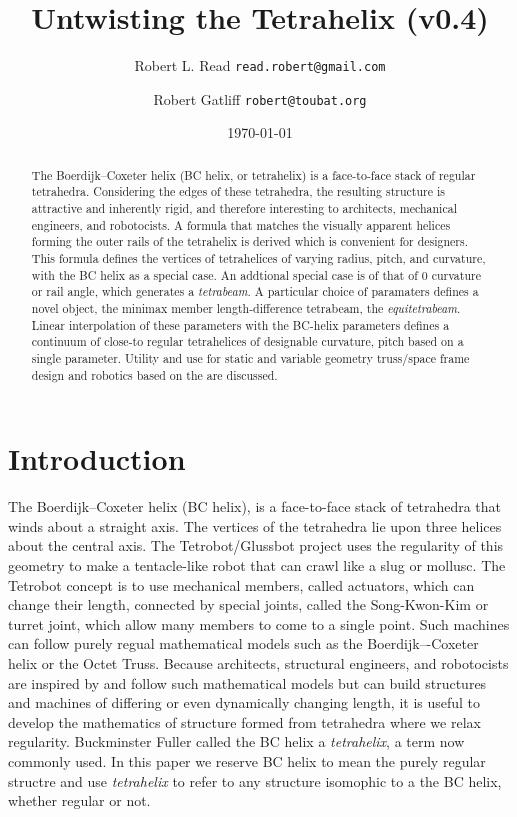 \documentclass[11pt]{article}
\title{Untwisting the Tetrahelix (v0.4)}
\author{Robert L. Read \texttt{read.robert@gmail.com} \and
  Robert Gatliff \texttt{robert@toubat.org}
}
\date{\today}
\begin{document}
\maketitle


\begin{abstract}
  The Boerdijk--Coxeter helix (BC helix, or tetrahelix) is a face-to-face stack of regular tetrahedra.
  Considering the edges of these tetrahedra, the resulting structure is attractive and inherently rigid,
  and therefore interesting to architects, mechanical engineers,
  and robotocists.
  A formula that matches the visually apparent helices forming the outer rails of the tetrahelix is derived which
  is convenient for designers.
  This formula defines the vertices of tetrahelices of varying radius, pitch, and curvature, with the BC helix
  as a special case. 
  An addtional special case is of that of $0$ curvature or rail angle, which generates a \emph{tetrabeam}.
  A particular choice of paramaters defines a novel object, the  minimax member length-difference tetrabeam,
  the \emph{equitetrabeam}.
  Linear interpolation of these parameters with the BC-helix parameters defines a continuum of close-to regular
  tetrahelices of designable curvature, pitch based on a single parameter.
  Utility and use for static and variable geometry truss/space frame design and robotics based on the are discussed.
\end{abstract}


\section{Introduction}

The Boerdijk--Coxeter helix\cite{coxeter1985simplicial} (BC helix),
is a face-to-face stack of tetrahedra that winds about a straight axis.
The vertices of the tetrahedra
lie upon three
helices about the central axis.
The Tetrobot/Glussbot\cite{TetrobotBook} project
uses the regularity of this geometry to make a tentacle-like robot that can crawl like a slug or mollusc.
The Tetrobot concept
is to use mechanical members, called actuators, which can change their length, connected by special joints, called the Song-Kwon-Kim\cite{song2003spherical} or turret joint,
which allow many
members to come to a single point.
Such machines can follow purely regual mathematical models such as the Boerdijk–-Coxeter helix or the Octet Truss\cite{richard1961synergetic}.
Because architects, structural engineers, and robotocists are inspired by and follow such mathematical models but can build
structures and machines of differing or even dynamically changing length, it is useful to develop
the mathematics of structure formed from tetrahedra where we relax regularity. Buckminster Fuller called the BC helix a \emph{tetrahelix}\cite{fuller1982synergetics},
a term now commonly used. In this paper we reserve BC helix to mean the purely regular structre and use \emph{tetrahelix} to refer
to any structure isomophic to a the BC helix, whether regular or not.
\end{document}
